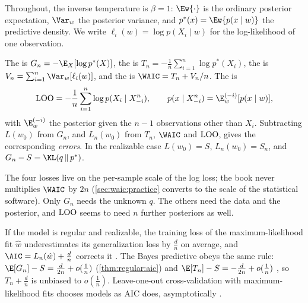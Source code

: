 \begin{refsection}
Throughout, the inverse temperature is $\beta=1$: $\Ew{\cdot}$ is the ordinary posterior expectation, $\Var_w$ the posterior variance, and $p^*(x)=\Ew{p(x\mid w)}$ the predictive density. We write $\ell_i(w)=\log p(X_i\mid w)$ for the log-likelihood of one observation.

\begin{definition}\label{def:waic:criteria}
The  is $G_n=-\E_X[\log p^*(X)]$, the  is $T_n=-\frac1n\sum_{i=1}^n\log p^*(X_i)$, the  is $V_n=\sum_{i=1}^n\Var_w[\ell_i(w)]$, and the  is $\WAIC=T_n+V_n/n$. The  is
\[
\waicLOO=-\frac1n\sum_{i=1}^n\log p(X_i\mid X^n_{-i}),\qquad p(x\mid X^n_{-i})=\E^{(-i)}_w[p(x\mid w)],
\]
with $\E^{(-i)}_w$ the posterior given the $n-1$ observations other than $X_i$. Subtracting $L(w_0)$ from $G_n$, and $L_n(w_0)$ from $T_n$, $\WAIC$ and $\mathrm{LOO}$, gives the corresponding \emph{errors}. In the realizable case $L(w_0)=S$, $L_n(w_0)=S_n$, and $G_n-S=\KL(q\,\|\,p^*)$.
\end{definition}

The four losses live on the per-sample scale of the log loss; the book never multiplies $\WAIC$ by $2n$ (\cref{sec:waic:practice} converts to the scale of the statistical software). Only $G_n$ needs the unknown $q$. The others need the data and the posterior, and $\mathrm{LOO}$ seems to need $n$ further posteriors as well.

\begin{regularanswer}
If the model is regular and realizable, the training loss of the maximum-likelihood fit $\hat w$ underestimates its generalization loss by $\tfrac dn$ on average, and $\AIC=L_n(\hat w)+\tfrac dn$ corrects it \parencite{Akaike1974}. The Bayes predictive obeys the same rule: $\E[G_n]-S=\tfrac d{2n}+o(\tfrac1n)$ (\cref{thm:regular:aic}) and $\E[T_n]-S=-\tfrac d{2n}+o(\tfrac1n)$ \parencite{Watanabe2010a}, so $T_n+\tfrac dn$ is unbiased to $o(\tfrac1n)$. Leave-one-out cross-validation with maximum-likelihood fits chooses models as AIC does, asymptotically \parencite{Stone1977}.
\end{regularanswer}


\end{refsection}
